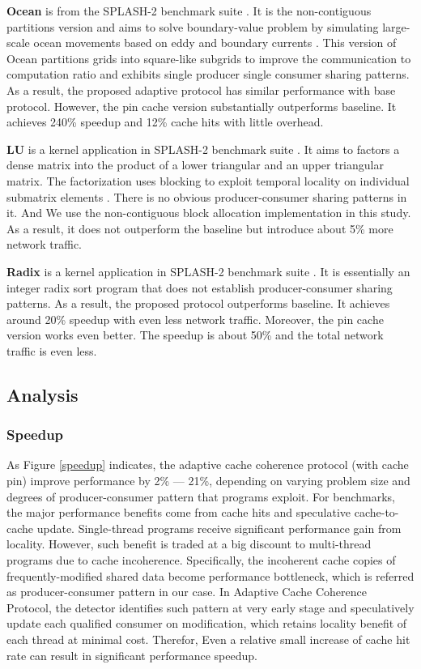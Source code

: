 \documentclass[conference]{IEEEtran}
\begin{document}
\textbf{Ocean} is from the SPLASH-2 benchmark suite \cite{splash}. It is the non-contiguous partitions version and aims to solve boundary-value problem by simulating large-scale ocean movements based on eddy and boundary currents \cite{ocean}. This version of Ocean partitions grids into square-like subgrids to improve the communication to computation ratio and exhibits single producer single consumer sharing patterns. As a result, the proposed adaptive protocol has similar performance with base protocol. However, the pin cache version substantially outperforms baseline. It achieves 240\% speedup and 12\% cache hits with little overhead.

\textbf{LU} is a kernel application in SPLASH-2 benchmark suite \cite{splash}. It aims to factors a dense matrix into the product of a lower triangular and an upper triangular matrix.  The factorization uses blocking to exploit temporal locality on individual submatrix elements \cite{lu}. There is no obvious producer-consumer sharing patterns in it. And We use the non-contiguous block allocation implementation in this study. As a result, it does not outperform the baseline but introduce about 5\% more network traffic.

\textbf{Radix} is a kernel application in SPLASH-2 benchmark suite \cite{splash}. It is essentially an integer radix sort program that does not establish producer-consumer sharing patterns. As a result, the proposed protocol outperforms baseline. It achieves around 20\% speedup with even less network traffic. Moreover, the pin cache version works even better. The speedup is about 50\% and the total network traffic is even less.


\subsection{Analysis}

\subsubsection{Speedup}
As Figure \ref{speedup} indicates, the adaptive cache coherence protocol (with cache pin) improve performance by 2\% --- 21\%, depending on varying problem size and degrees of producer-consumer pattern that programs exploit. For benchmarks, the major performance benefits come from cache hits and speculative cache-to-cache update. Single-thread programs receive significant performance gain from locality. However, such benefit is traded at a big discount to multi-thread programs due to cache incoherence. Specifically, the incoherent cache copies of frequently-modified shared data become performance bottleneck, which is referred as producer-consumer pattern in our case. In Adaptive Cache Coherence Protocol, the detector identifies such pattern at very early stage and speculatively update each qualified consumer on modification, which retains locality benefit of each thread at minimal cost. Therefor, Even a relative small increase of cache hit rate can result in significant performance speedup.
\end{document}
